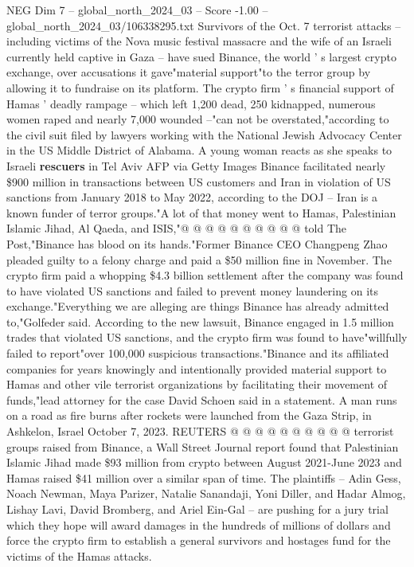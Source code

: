 \begin{textsample}{NEG Dim 7 – global\_north\_2024\_03 – Score -1.00 – global\_north\_2024\_03/106338295.txt}  \label{ex:f7_neg_419}
Survivors of the Oct. 7 terrorist attacks -- including victims of the Nova music festival massacre and the wife of an Israeli currently held captive in Gaza -- have sued Binance, the world ' s largest crypto exchange, over accusations it gave"material support"to the terror group by allowing it to fundraise on its platform.
The crypto firm ' s financial support of Hamas ' deadly rampage -- which left 1,200 dead, 250 kidnapped, numerous women raped and nearly 7,000 wounded --"can not be overstated,"according to the civil suit filed by lawyers working with the National Jewish Advocacy Center in the US Middle District of Alabama.
A young woman reacts as she speaks to Israeli \textbf{rescuers} in Tel Aviv AFP via Getty Images Binance facilitated nearly \$900 million in transactions between US customers and Iran in violation of US sanctions from January 2018 to May 2022, according to the DOJ -- Iran is a known funder of terror groups."A lot of that money went to Hamas, Palestinian Islamic Jihad, Al Qaeda, and ISIS,"@ @ @ @ @ @ @ @ @ @ told The Post,"Binance has blood on its hands."Former Binance CEO Changpeng Zhao pleaded guilty to a felony charge and paid a \$50 million fine in November.
The crypto firm paid a whopping \$4.3 billion settlement after the company was found to have violated US sanctions and failed to prevent money laundering on its exchange."Everything we are alleging are things Binance has already admitted to,"Golfeder said.
According to the new lawsuit, Binance engaged in 1.5 million trades that violated US sanctions, and the crypto firm was found to have"willfully failed to report"over 100,000 suspicious transactions."Binance and its affiliated companies for years knowingly and intentionally provided material support to Hamas and other vile terrorist organizations by facilitating their movement of funds,"lead attorney for the case David Schoen said in a statement.
A man runs on a road as fire burns after rockets were launched from the Gaza Strip, in Ashkelon, Israel October 7, 2023.
REUTERS @ @ @ @ @ @ @ @ @ @ terrorist groups raised from Binance, a Wall Street Journal report found that Palestinian Islamic Jihad made \$93 million from crypto between August 2021-June 2023 and Hamas raised \$41 million over a similar span of time.
The plaintiffs -- Adin Gess, Noach Newman, Maya Parizer, Natalie Sanandaji, Yoni Diller, and Hadar Almog, Lishay Lavi, David Bromberg, and Ariel Ein-Gal -- are pushing for a jury trial which they hope will award damages in the hundreds of millions of dollars and force the crypto firm to establish a general survivors and hostages fund for the victims of the Hamas attacks.

\end{textsample}
